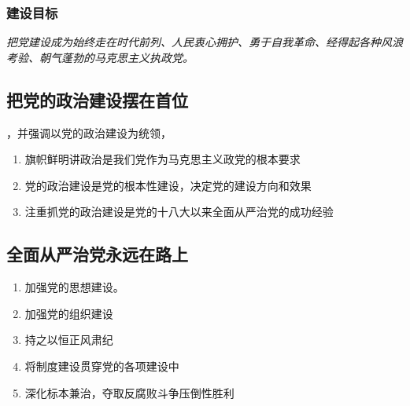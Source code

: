         \subsubsection{建设目标}
        \emph{把党建设成为始终走在时代前列、人民衷心拥护、勇于自我革命、经得起各种风浪考验、朝气蓬勃的马克思主义执政党。}

    \subsection{把党的政治建设摆在首位}
        ，并强调以党的政治建设为统领，
        \begin{enumerate}
            \item 旗帜鲜明讲政治是我们党作为马克思主义政党的根本要求
            \item 党的政治建设是党的根本性建设，决定党的建设方向和效果
            \item 注重抓党的政治建设是党的十八大以来全面从严治党的成功经验
        \end{enumerate}


    \subsection{全面从严治党永远在路上}
        \begin{enumerate}
            \item 加强党的思想建设。
            \item 加强党的组织建设
            \item 持之以恒正风肃纪
            \item 将制度建设贯穿党的各项建设中
            \item 深化标本兼治，夺取反腐败斗争压倒性胜利
        \end{enumerate}
